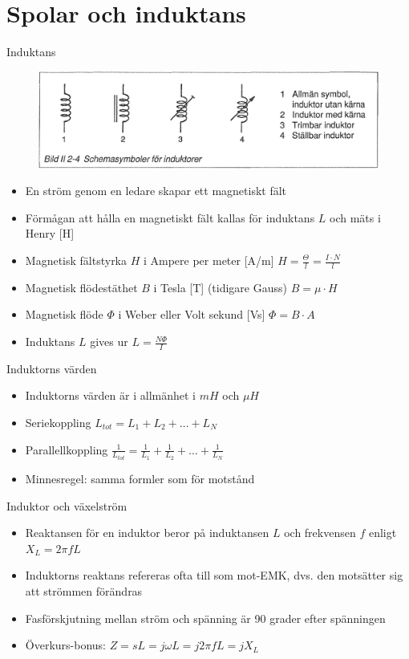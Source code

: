 \documentclass{beamer}
\begin{document}
\section{Spolar och induktans}

\begin{frame}{Induktans}

\begin{figure}[h]
\includegraphics[width=\textwidth]{images/bild_2_2-04}
\end{figure}

\begin{itemize}
  \item En ström genom en ledare skapar ett magnetiskt fält
  \item Förmågan att hålla en magnetiskt fält kallas för induktans $L$ och mäts i Henry [H]
  \item Magnetisk fältstyrka $H$ i Ampere per meter [A/m] $H=\frac{\Theta}{l} = \frac{I \cdot N}{l}$
  \item Magnetisk flödestäthet $B$ i Tesla [T] (tidigare Gauss) $B = \mu \cdot H$
  \item Magnetisk flöde $\Phi$ i Weber eller Volt sekund [Vs] $\Phi = B \cdot A$
  \item Induktans $L$ gives ur $L=\frac{N\Phi}{I}$
\end{itemize}
\end{frame}

\begin{frame}{Induktorns värden}
  \begin{itemize}
    \item Induktorns värden är i allmänhet i $mH$ och $\mu H$
    \item Seriekoppling $L_{tot} = L_1 + L_2 + \ldots + L_N$
    \item Parallellkoppling $\frac{1}{L_{tot}} = \frac{1}{L_1} + \frac{1}{L_2} + \ldots + \frac{1}{L_N}$
    \item Minnesregel: samma formler som för motstånd
  \end{itemize}
\end{frame}

\begin{frame}{Induktor och växelström}
  \begin{itemize}
  \item Reaktansen för en induktor beror på induktansen $L$ och frekvensen $f$ enligt $X_L = 2\pi f L$
  \item Induktorns reaktans refereras ofta till som mot-EMK, dvs. den motsätter sig att strömmen förändras
  \item Fasförskjutning mellan ström och spänning är 90 grader efter spänningen
  \item Överkurs-bonus: $Z = sL = j\omega L = j2\pi f L = jX_L$ 
  \end{itemize}
\end{frame}
\end{document}
